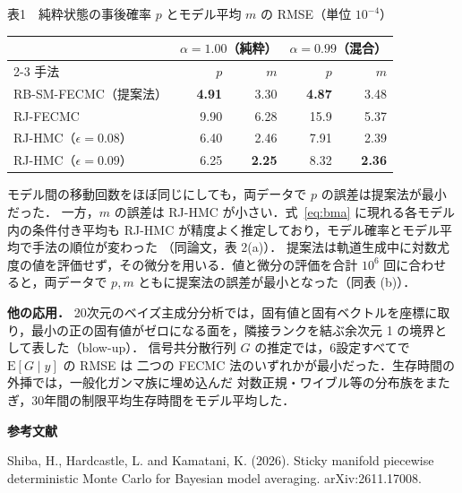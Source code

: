 \documentclass[leqno,a4j]{jarticle}
\numberwithin{equation}{section}
\begin{document}
\begin{center}
表1　純粋状態の事後確率 $p$ とモデル平均 $m$ の RMSE（単位 $10^{-4}$）\\[3pt]
\begin{tabular}{lrrrr}
\hline
 & \multicolumn{2}{c}{$\alpha=1.00$（純粋）} & \multicolumn{2}{c}{$\alpha=0.99$（混合）} \\
\cline{2-3}\cline{4-5}
手法 & $p$ & $m$ & $p$ & $m$ \\
\hline
RB-SM-FECMC（提案法）  & \textbf{4.91} & 3.30 & \textbf{4.87} & 3.48 \\
RJ-FECMC              & 9.90 & 6.28 & 15.9 & 5.37 \\
RJ-HMC（$\epsilon=0.08$） & 6.40 & 2.46 & 7.91 & 2.39 \\
RJ-HMC（$\epsilon=0.09$） & 6.25 & \textbf{2.25} & 8.32 & \textbf{2.36} \\
\hline
\end{tabular}
\end{center}
モデル間の移動回数をほぼ同じにしても，両データで $p$ の誤差は提案法が最小だった．
一方，$m$ の誤差は RJ-HMC が小さい．式~\eqref{eq:bma} に現れる各モデル内の条件付き平均も
RJ-HMC が精度よく推定しており，モデル確率とモデル平均で手法の順位が変わった
（同論文，表 2(a)）．
提案法は軌道生成中に対数尤度の値を評価せず，その微分を用いる．値と微分の評価を合計 $10^6$ 回に合わせると，両データで $p,m$ ともに提案法の誤差が最小となった（同表 (b)）．

\textbf{他の応用．}
20次元のベイズ主成分分析では，固有値と固有ベクトルを座標に取り，最小の正の固有値がゼロになる面を，隣接ランクを結ぶ余次元 1 の境界として表した（blow-up）．
信号共分散行列 $G$ の推定では，6設定すべてで $\mathrm{E}[G\mid y]$ の RMSE は
二つの FECMC 法のいずれかが最小だった．生存時間の外挿では，一般化ガンマ族に埋め込んだ
対数正規・ワイブル等の分布族をまたぎ，30年間の制限平均生存時間をモデル平均した．

\begin{center}
\textbf{\large{参考文献}}
\end{center}
\noindent
Shiba, H., Hardcastle, L. and Kamatani, K. (2026).
Sticky manifold piecewise deterministic Monte Carlo for Bayesian model averaging.
arXiv:2611.17008.
\end{document}
